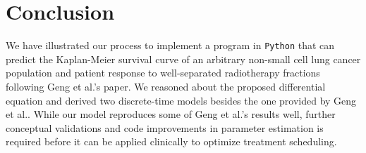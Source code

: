 \documentclass[letterpaper
, superscriptaddress
, twocolumn
, aps
]{revtex4}
\begin{document}
\section{Conclusion}
We have illustrated our process to implement a program in \texttt{Python} that can predict the Kaplan-Meier survival curve of an arbitrary non-small cell lung cancer population and patient response to well-separated radiotherapy fractions following Geng et al.'s paper. We reasoned about the proposed differential equation and derived two discrete-time models besides the one provided by Geng et al.. While our model reproduces some of Geng et al.'s results well, further conceptual validations and code improvements in parameter estimation is required before it can be applied clinically to optimize treatment scheduling.

\newpage


%
%
%
%
%
%


\end{document}
